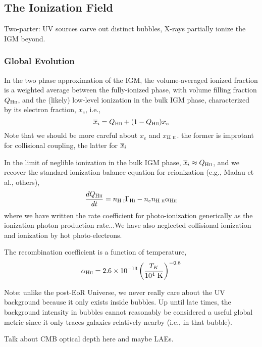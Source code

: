 \subsection{The Ionization Field}
Two-parter: UV sources carve out distinct bubbles, X-rays partially ionize the IGM beyond. 



\subsubsection{Global Evolution} \label{sec:ionization_global}
In the two phase approximation of the IGM, the volume-averaged ionized fraction is a weighted average between the fully-ionized phase, with volume filling fraction $Q_{\text{H} {\textsc{ii}}}$, and the (likely) low-level ionization in the bulk IGM phase, characterized by its electron fraction, $x_e$, i.e.,
\begin{equation}
	\overline{x}_i = Q_{\text{H} {\textsc{ii}}} + (1 - Q_{\text{H} {\textsc{ii}}}) x_e
\end{equation}
{\color{red} Note that we should be more careful about $x_e$ and $x_{\text{H } \textsc{ii}}$. the former is improtant for collisional coupling, the latter for $\overline{x}_i$}

In the limit of neglible ionization in the bulk IGM phase, $\overline{x}_i \approx Q_{\text{H} {\textsc{ii}}}$, and we recover the standard ionization balance equation for reionization (e.g., Madau et al., others),
\begin{equation}
	\frac{d Q_{\text{H} {\textsc{ii}}}}{dt} = n_{\text{H } \textsc{i}} \Gamma_{\text{H} {\textsc{i}}} - n_e n_{\text{H } \textsc{ii}} \alpha_{\text{H} {\textsc{ii}}} \label{eq:ion_balance}
\end{equation}
where we have written the rate coefficient for photo-ionization generically as {\color{red} the ionization photon production rate}...We have also neglected collisional ionization and ionization by hot photo-electrons. 

The recombination coefficient is a function of temperature,
\begin{equation}
	\alpha_{\text{H} {\textsc{ii}}} = 2.6 \times 10^{-13} \left(\frac{T_K}{10^4 \ \mathrm{K}} \right)^{-0.8}
\end{equation}

Note: unlike the post-EoR Universe, we never really care about the UV background because it only exists inside bubbles. Up until late times, the background intensity in bubbles cannot reasonably be considered a useful global metric since it only traces galaxies relatively nearby (i.e., in that bubble).

Talk about CMB optical depth here and maybe LAEs.

